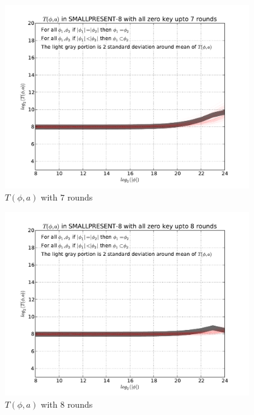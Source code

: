 \documentclass[9pt]{article}
\begin{document}
\begin{figure}[h!]
    \centering
    \includegraphics[width=\textwidth , height = 8cm]{T_a_phi_variable_a_varible_phi_variable_size_07rounds}
    \caption{$T(\phi,a)$ with $7$ rounds}
    \label{fig:T_a_phi_variable_a_varible_phi_variable_size_07rounds}
\end{figure}

\begin{figure}[h!]
    \centering
    \includegraphics[width=\textwidth , height = 8cm]{T_a_phi_variable_a_varible_phi_variable_size_08rounds}
    \caption{$T(\phi,a)$ with $8$ rounds}
    \label{fig:T_a_phi_variable_a_varible_phi_variable_size_08rounds}
\end{figure}
\end{document}

